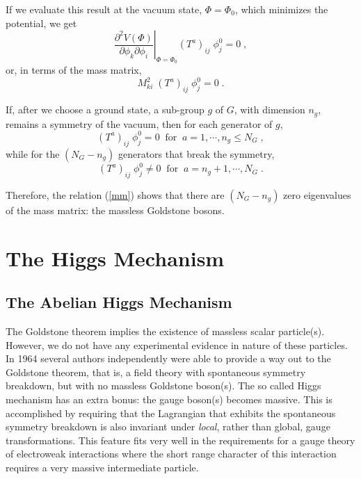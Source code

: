 \documentclass[12pt]{report}
\begin{document}
If we evaluate this result at the vacuum state, $\Phi = \Phi_0$, which
minimizes the potential, we get
\[
\left . \frac{\partial^2 V(\Phi)}{\partial \phi_k \partial\phi_i} 
\right |_{\Phi = \Phi_0} (T^a)_{ij} \; \phi_{j}^0 =  0 \; ,
\]
or, in terms of the mass matrix,
\begin{equation}
M^2_{ki} \; (T^a)_{ij} \; \phi_{j}^0 = 0 \; .
\label{mm}
\end{equation}

If, after we choose a ground state, a sub-group $g$ of $G$, with
dimension $n_g$, remains a symmetry of the vacuum, then for each
generator of $g$, 
\[
(T^a)_{ij} \; \phi_{j}^0 = 0 \;\; \mbox{for} \;\; a = 1, \cdots , n_g
\leq N_G \; ,
\]
while for the $(N_G - n_g)$ generators that break the symmetry,
\[
(T^a)_{ij} \; \phi_{j}^0 \neq 0 \;\; \mbox{for} \;\; a = n_g + 1, \cdots
, N_G \; .
\]

Therefore,  the relation (\ref{mm}) shows that there are $(N_G - n_g)$ zero 
eigenvalues  of the mass matrix: the massless Goldstone bosons.


\section{The Higgs Mechanism} \label{higgs} \indent

\subsection{The Abelian Higgs Mechanism}

The Goldstone theorem implies the existence of massless scalar
particle(s). However, we do not have any experimental evidence in
nature of these particles. In 1964 several authors independently 
\cite{Higgs:64,Englert:64,Guralnik:64} were able to provide a way out
to the Goldstone theorem, that is, a field theory with spontaneous
symmetry breakdown, but with no massless Goldstone boson(s). The so
called Higgs mechanism has an extra bonus: the gauge boson(s) becomes
massive. This is accomplished by requiring that the Lagrangian that
exhibits the spontaneous symmetry breakdown is also invariant under 
{\it local}, rather than global, gauge transformations.  This feature
fits very well in the requirements for a gauge theory of electroweak
interactions where the short range character of this interaction
requires a very massive intermediate particle. 
\end{document}
